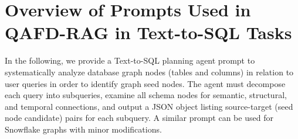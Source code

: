 \documentclass{article} %
\newcounter{promptcounter}
\newenvironment{promptbox}[2]{%
    \refstepcounter{promptcounter}%
    \label{#1}%
    \begin{tcolorbox}[
        colback=promptbg,
        colframe=promptborder,
        coltitle=white,
        colbacktitle=promptborder,
        title={\textbf{Prompt \thepromptcounter: #2}},
        fonttitle=\sffamily\bfseries,
        enhanced,
        breakable,
        attach boxed title to top left={yshift=-2mm, xshift=2mm},
        boxed title style={rounded corners},
        rounded corners,
        drop shadow,
        left=4pt,
        right=4pt,
        top=6pt,
        bottom=6pt
    ]%
}{%
    \end{tcolorbox}%
}
\begin{document}







\section{Overview of Prompts Used in QAFD-RAG in Text-to-SQL Tasks}\label{app:prompts:text-to-sql}

In the following, we provide a Text-to-SQL planning agent prompt to systematically analyze database graph nodes (tables and columns) in relation to user queries in order to identify graph seed nodes. The agent must decompose each query into subqueries, examine all schema nodes for semantic, structural, and temporal connections, and output a JSON object listing source-target (seed node candidate) pairs for each subquery. A similar prompt can be used for Snowflake graphs with minor modifications.
\end{document}
